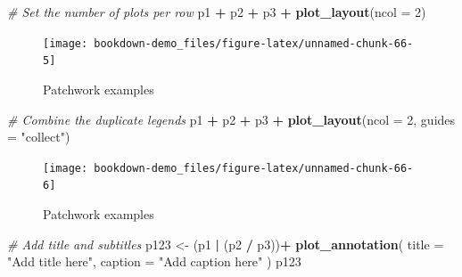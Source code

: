 \documentclass[]{book}
\newenvironment{Shaded}{\begin{snugshade}}{\end{snugshade}}
\newcommand{\KeywordTok}[1]{\textcolor[rgb]{0.13,0.29,0.53}{\textbf{#1}}}
\newcommand{\DataTypeTok}[1]{\textcolor[rgb]{0.13,0.29,0.53}{#1}}
\newcommand{\DecValTok}[1]{\textcolor[rgb]{0.00,0.00,0.81}{#1}}
\newcommand{\StringTok}[1]{\textcolor[rgb]{0.31,0.60,0.02}{#1}}
\newcommand{\CommentTok}[1]{\textcolor[rgb]{0.56,0.35,0.01}{\textit{#1}}}
\newcommand{\OperatorTok}[1]{\textcolor[rgb]{0.81,0.36,0.00}{\textbf{#1}}}
\newcommand{\NormalTok}[1]{#1}
\begin{document}
\begin{Shaded}
\begin{Highlighting}[]
\CommentTok{# Set the number of plots per row}
\NormalTok{p1 }\OperatorTok{+}\StringTok{ }\NormalTok{p2 }\OperatorTok{+}\StringTok{ }\NormalTok{p3 }\OperatorTok{+}\StringTok{ }\KeywordTok{plot_layout}\NormalTok{(}\DataTypeTok{ncol =} \DecValTok{2}\NormalTok{)}
\end{Highlighting}
\end{Shaded}

\begin{figure}

{\centering \texttt{[image: bookdown-demo\_files/figure-latex/unnamed-chunk-66-5]} 

}

\caption{Patchwork examples}\label{fig:unnamed-chunk-66-5}
\end{figure}

\begin{Shaded}
\begin{Highlighting}[]
\CommentTok{# Combine the duplicate legends}
\NormalTok{p1 }\OperatorTok{+}\StringTok{ }\NormalTok{p2 }\OperatorTok{+}\StringTok{ }\NormalTok{p3 }\OperatorTok{+}\StringTok{ }\KeywordTok{plot_layout}\NormalTok{(}\DataTypeTok{ncol =} \DecValTok{2}\NormalTok{, }\DataTypeTok{guides =} \StringTok{"collect"}\NormalTok{)}
\end{Highlighting}
\end{Shaded}

\begin{figure}

{\centering \texttt{[image: bookdown-demo\_files/figure-latex/unnamed-chunk-66-6]} 

}

\caption{Patchwork examples}\label{fig:unnamed-chunk-66-6}
\end{figure}

\begin{Shaded}
\begin{Highlighting}[]
\CommentTok{# Add title and subtitles}
\NormalTok{p123 <-}\StringTok{ }\NormalTok{(p1 }\OperatorTok{|}\StringTok{ }\NormalTok{(p2 }\OperatorTok{/}\StringTok{ }\NormalTok{p3))}\OperatorTok{+}\StringTok{ }\KeywordTok{plot_annotation}\NormalTok{(}
  \DataTypeTok{title =} \StringTok{"Add title here"}\NormalTok{,}
  \DataTypeTok{caption =} \StringTok{"Add caption here"}
\NormalTok{)}
\NormalTok{p123}
\end{Highlighting}
\end{Shaded}
\end{document}
